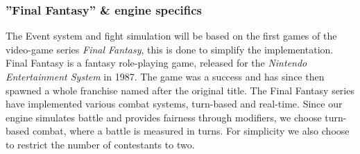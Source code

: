 \subsubsection*{''Final Fantasy'' \& engine specifics}
The Event system and fight simulation will be based on the first games of the video-game series \emph{Final Fantasy}, this is done to simplify the implementation. Final Fantasy is a fantasy role-playing game, released for the \emph{Nintendo Entertainment System} in 1987. The game was a success and has since then spawned a whole franchise named after the original title.
The Final Fantasy series have implemented various combat systems, turn-based and real-time.\cite{ffantasy}
Since our engine simulates battle and provides fairness through modifiers, we choose turn-based combat, where a battle is measured in turns.
For simplicity we also choose to restrict the number of contestants to two.



